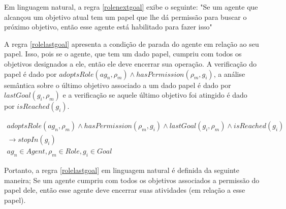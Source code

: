 Em linguagem natural, a regra \ref{rolenextgoal} exibe o seguinte: "Se um agente que alcançou um objetivo atual tem um papel que lhe dá permissão para buscar o próximo objetivo, então esse agente está habilitado para fazer isso"

A regra \ref{rolelastgoal} apresenta a condição de parada do agente em relação ao seu papel. Isso, pois se o agente, que tem um dado papel,
cumpriu com todos os objetivos designados a ele, então ele deve encerrar sua operação. A verificação do papel é dado por $adoptsRole(ag_n,\rho_m) \wedge hasPermission(\rho_m,g_i)$, a análise semântica sobre o último objetivo associado a um dado papel é dado por $lastGoal(g_i,\rho_m)$ e a verificação se aquele último objetivo foi atingido é dado por $isReached(g_i)$. 

\begin{eqnarray}\label{rolelastgoal}
	adoptsRole(ag_n,\rho_m) \wedge hasPermission(\rho_m,g_i) \wedge lastGoal(g_i,\rho_m) \wedge isReached(g_i) \nonumber \\
	\to stopIn(g_i) \nonumber \\
    ag_n \in Agent, \rho_m \in Role, g_i \in Goal
\end{eqnarray}

Portanto, a regra \ref{rolelastgoal} em linguagem natural é definida da seguinte maneira; Se um agente cumpriu com todos os objetivos associados a permissão do papel dele, então esse agente deve encerrar suas atividades (em relação a esse papel). 
